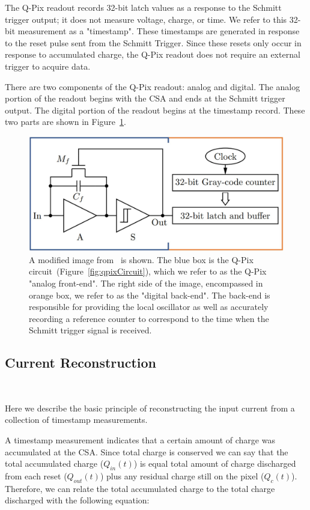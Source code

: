The Q-Pix readout records 32-bit latch values as a response to the Schmitt trigger output; it does not measure voltage, charge, or time.
We refer to this 32-bit measurement as a "timestamp".
These timestamps are generated in response to the reset pulse sent from the Schmitt Trigger.
Since these resets only occur in response to accumulated charge, the Q-Pix readout does not require an external trigger to acquire data.

There are two components of the Q-Pix readout: analog and digital.
The analog portion of the readout begins with the CSA and ends at the Schmitt trigger output.
The digital portion of the readout begins at the timestamp record.
These two parts are shown in Figure~\ref{fig:qpix_frontandbackend}.

\begin{figure}[]
\centering
\includegraphics[width=\textwidth]{images/qpix_circuit_frontandbackend.jpg}
\caption{A modified image from~\citep{qpix:nygren:mei} is shown.
The blue box is the Q-Pix circuit~(Figure~\ref{fig:qpixCircuit}), which we refer to as the Q-Pix "analog front-end".
The right side of the image, encompassed in orange box, we refer to as the "digital back-end".
The back-end is responsible for providing the local oscillator as well as accurately recording a reference counter to correspond to the time when the Schmitt trigger signal is received.
}
\label{fig:qpix_frontandbackend}
\end{figure}

\subsection{Current Reconstruction}~\label{sec:rtds_and_waveforms}

Here we describe the basic principle of reconstructing the input current from a collection of timestamp measurements.

A timestamp measurement indicates that a certain amount of charge was accumulated at the CSA.
Since total charge is conserved we can say that the total accumulated charge ($Q_{in}(t)$) is equal total amount of charge discharged from each reset ($Q_{out}(t)$) plus any residual charge still on the pixel ($Q_{c}(t)$).
Therefore, we can relate the total accumulated charge to the total charge discharged with the following equation:

